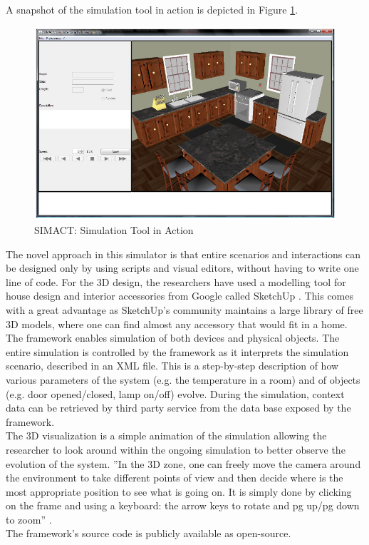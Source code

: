 A snapshot of the simulation tool in action is depicted in Figure \ref{fig:simact_simulation_tool}.

\begin{figure}[H]
	\centering
	\includegraphics[width=\linewidth]{gfx/Chapter2/simact_simulation_tool}
	\caption{SIMACT: Simulation Tool in Action}
	\label{fig:simact_simulation_tool}
\end{figure}

The novel approach in this simulator is that entire scenarios and interactions can be designed only by using scripts and visual editors, without having to write one line of code. For the 3D design, the researchers have used a modelling tool for house design and interior accessories from Google called SketchUp \cite{sketchup:online}. This comes with a great advantage as SketchUp's community maintains a large library of free 3D models, where one can find almost any accessory that would fit in a home.\\

The framework enables simulation of both devices and physical objects. The entire simulation is controlled by the framework as it interprets the simulation scenario, described in an XML file. This is a step-by-step description of how various parameters of the system (e.g. the temperature in a room) and of objects (e.g. door opened/closed, lamp on/off) evolve. During the simulation, context data can be retrieved by third party service from the data base exposed by the framework.\\

The 3D visualization is a simple animation of the simulation allowing the researcher to look around within the ongoing simulation to better observe the evolution of the system. ''In the 3D zone, one can freely move the camera around the environment to take different points of view and then decide where is the most appropriate position to see what is going on. It is simply done by clicking on the frame and using a keyboard: the arrow keys to rotate and pg up/pg down to zoom'' \cite{bouchard2012simact}.\\

The framework's source code is publicly available as open-source.
